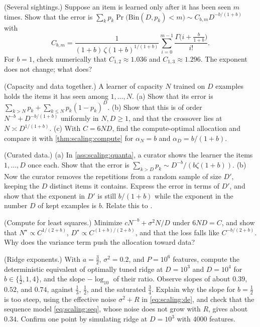 \begin{refsection}
\begin{exercises}
\item \variation (Several sightings.) Suppose an item is learned only after it has been seen $m$ times. Show that the error is $\sum_kp_k\Pr\bigl(\mathrm{Bin}(D,p_k)<m\bigr)\sim C_{b,m}D^{-b/(1+b)}$ with
\[
  C_{b,m}=\frac1{(1+b)\,\zeta(1+b)^{1/(1+b)}}\sum_{i=0}^{m-1}\frac{\Gamma\bigl(i+\frac b{1+b}\bigr)}{i!} .
\]
For $b=1$, check numerically that $C_{1,2}\approx1.036$ and $C_{1,3}\approx1.296$. The exponent does not change; what does?\label{ex:scaling:sightings}

\item \variation (Capacity and data together.) A learner of capacity $N$ trained on $D$ examples holds the items it has seen among $1,\dots,N$. (a) Show that its error is $\sum_{k>N}p_k+\sum_{k\le N}p_k(1-p_k)^D$. (b) Show that this is of order $N^{-b}+D^{-b/(1+b)}$ uniformly in $N,D\ge1$, and that the crossover lies at $N\asymp D^{1/(1+b)}$. (c) With $C=6ND$, find the compute-optimal allocation and compare it with \cref{thm:scaling:compute} for $\alpha_N=b$ and $\alpha_D=b/(1+b)$.\label{ex:scaling:combined}

\item \variation (Curated data.) (a) In \cref{ass:scaling:quanta}, a curator shows the learner the items $1,\dots,D$ once each. Show that the error is $\sum_{k>D}p_k\sim D^{-b}/(b\zeta(1+b))$. (b) Now the curator removes the repetitions from a random sample of size $D'$, keeping the $D$ distinct items it contains. Express the error in terms of $D'$, and show that the exponent in $D'$ is still $b/(1+b)$ while the exponent in the number $D$ of kept examples is $b$. Relate this to \textcite{SorscherEtAl2022}.\label{ex:scaling:pruning}

\item \variation (Compute for least squares.) Minimize $cN^{-b}+\sigma^2N/D$ under $6ND=C$, and show that $N^\star\propto C^{1/(2+b)}$, $D^\star\propto C^{(1+b)/(2+b)}$, and that the loss falls like $C^{-b/(2+b)}$. Why does the variance term push the allocation toward data?\label{ex:scaling:olscompute}

\item \simulation (Ridge exponents.) With $a=\frac32$, $\sigma^2=0.2$, and $P=10^6$ features, compute the deterministic equivalent of optimally tuned ridge at $D=10^3$ and $D=10^4$ for $b\in\{\frac12,1,4\}$, and the slope $-\log_{10}$ of their ratio. Observe slopes of about $0.39$, $0.52$, and $0.74$, against $\frac13$, $\frac12$, and the saturated $\frac34$. Explain why the slope for $b=\frac12$ is too steep, using the effective noise $\sigma^2+R$ in \eqref{eq:scaling:de}, and check that the sequence model \eqref{eq:scaling:seq}, whose noise does not grow with $R$, gives about $0.34$. Confirm one point by simulating ridge at $D=10^3$ with $4000$ features.\label{ex:scaling:simridge}


\end{exercises}
\end{refsection}
